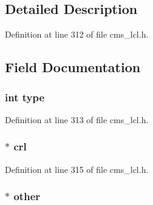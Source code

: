 \subsection{Detailed Description}


Definition at line 312 of file cms\+\_\+lcl.\+h.



\subsection{Field Documentation}
\subsubsection[{\texorpdfstring{type}{type}}]{\setlength{\rightskip}{0pt plus 5cm}int type}\hypertarget{struct_c_m_s___revocation_info_choice__st_ac765329451135abec74c45e1897abf26}{}\label{struct_c_m_s___revocation_info_choice__st_ac765329451135abec74c45e1897abf26}


Definition at line 313 of file cms\+\_\+lcl.\+h.

\subsubsection[{\texorpdfstring{crl}{crl}}]{$\ast$ crl}\hypertarget{struct_c_m_s___revocation_info_choice__st_a34fe84e0f1ecba5f97d6b22eded9c633}{}\label{struct_c_m_s___revocation_info_choice__st_a34fe84e0f1ecba5f97d6b22eded9c633}


Definition at line 315 of file cms\+\_\+lcl.\+h.

\subsubsection[{\texorpdfstring{other}{other}}]{$\ast$ other}\hypertarget{struct_c_m_s___revocation_info_choice__st_a720950b458829769c5f14991524b04d5}{}\label{struct_c_m_s___revocation_info_choice__st_a720950b458829769c5f14991524b04d5}


